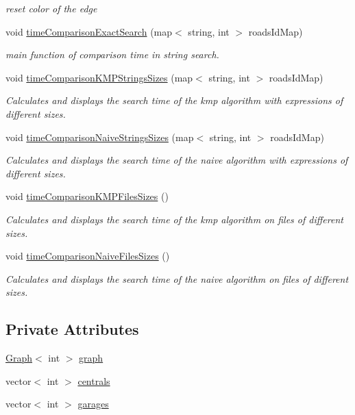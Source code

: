 \begin{DoxyCompactItemize}
\begin{DoxyCompactList}\small\item\em reset color of the edge \end{DoxyCompactList}\item 
void \hyperlink{classSmartWaste_ac24caa86ac0a9308daf839b66ddc28ae}{time\+Comparison\+Exact\+Search} (map$<$ string, int $>$ roads\+Id\+Map)
\begin{DoxyCompactList}\small\item\em main function of comparison time in string search. \end{DoxyCompactList}\item 
void \hyperlink{classSmartWaste_a6d8bfbc9102640c3ec1e9e9d71338b30}{time\+Comparison\+K\+M\+P\+Strings\+Sizes} (map$<$ string, int $>$ roads\+Id\+Map)
\begin{DoxyCompactList}\small\item\em Calculates and displays the search time of the kmp algorithm with expressions of different sizes. \end{DoxyCompactList}\item 
void \hyperlink{classSmartWaste_a6eb1a1ed26014c2785bd880696106688}{time\+Comparison\+Naive\+Strings\+Sizes} (map$<$ string, int $>$ roads\+Id\+Map)
\begin{DoxyCompactList}\small\item\em Calculates and displays the search time of the naive algorithm with expressions of different sizes. \end{DoxyCompactList}\item 
void \hyperlink{classSmartWaste_a63d659670d34638ada6460912e6b1f8a}{time\+Comparison\+K\+M\+P\+Files\+Sizes} ()
\begin{DoxyCompactList}\small\item\em Calculates and displays the search time of the kmp algorithm on files of different sizes. \end{DoxyCompactList}\item 
void \hyperlink{classSmartWaste_a102f65c9cd8af166e72a25de85ecc467}{time\+Comparison\+Naive\+Files\+Sizes} ()
\begin{DoxyCompactList}\small\item\em Calculates and displays the search time of the naive algorithm on files of different sizes. \end{DoxyCompactList}\end{DoxyCompactItemize}
\subsection*{Private Attributes}
\begin{DoxyCompactItemize}
\item 
\hyperlink{classGraph}{Graph}$<$ int $>$ \hyperlink{classSmartWaste_a653f3e0a3fb2148fb3e59ec9532f6d04}{graph}
\item 
vector$<$ int $>$ \hyperlink{classSmartWaste_aac31f2b8c6bd3f931346024435e36f5f}{centrals}
\item 
vector$<$ int $>$ \hyperlink{classSmartWaste_a624a2893edb7c0e00e4fefe635a0c597}{garages}
\end{DoxyCompactItemize}


